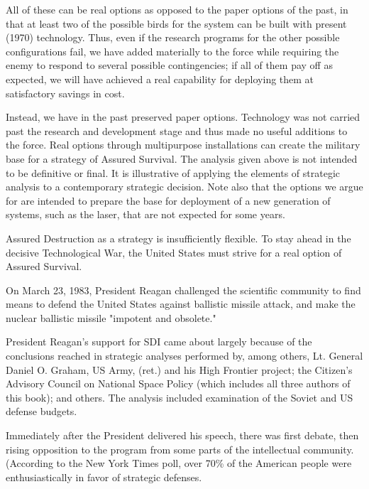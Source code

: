 All of these can be real options as opposed to the paper options of the past, in that at least two of the possible birds for the system can be built with present (1970) technology. Thus, even if the research programs for the other possible configurations fail, we have added materially to the force while requiring the enemy to respond to several possible contingencies; if all of them pay off as expected, we will have achieved a real capability for deploying them at satisfactory savings in cost.

Instead, we have in the past preserved paper options. Technology was not carried past the research and development stage and thus made no useful additions to the force. Real options through multipurpose installations can create the military base for a strategy of Assured Survival. The analysis given above is not intended to be definitive or final. It is illustrative of applying the elements of strategic analysis to a contemporary strategic decision. Note also that the options we argue for are intended to prepare the base for deployment of a new generation of systems, such as the laser, that are not expected for some years.

Assured Destruction as a strategy is insufficiently flexible. To stay ahead in the decisive Technological War, the United States must strive for a real option of Assured Survival.

\begin{mdframed}[backgroundcolor=black!10]
On March 23, 1983, President Reagan challenged the scientific community to find means to defend the United States against ballistic missile attack, and make the nuclear ballistic missile "impotent and obsolete."
\end{mdframed}

President Reagan's support for SDI came about largely because of the conclusions reached in strategic analyses performed by, among others, Lt. General Daniel O. Graham, US Army, (ret.) and his High Frontier project; the Citizen's Advisory Council on National Space Policy (which includes all three authors of this book); and others. The analysis included examination of the Soviet and US defense budgets.

Immediately after the President delivered his speech, there was first debate, then rising opposition to the program from some parts of the intellectual community. (According to the New York Times poll, over 70\% of the American people were enthusiastically in favor of strategic defenses.

